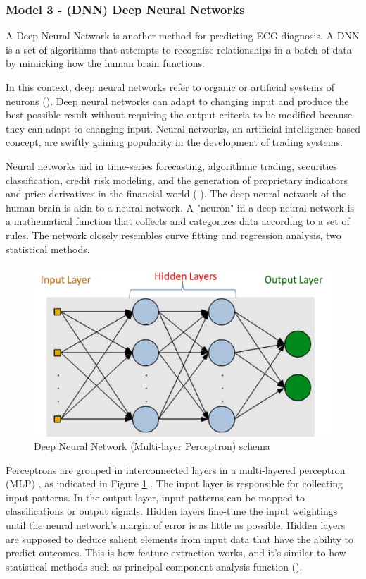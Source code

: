\subsubsection{Model 3 - (DNN) Deep Neural Networks} \label{3model3}

A Deep Neural Network is another method for predicting ECG diagnosis. A DNN is a set of algorithms that attempts to recognize relationships in a batch of data by mimicking how the human brain functions.

In this context, deep neural networks refer to organic or artificial systems of neurons (\cite{ann1}). Deep neural networks can adapt to changing input and produce the best possible result without requiring the output criteria to be modified because they can adapt to changing input. Neural networks, an artificial intelligence-based concept, are swiftly gaining popularity in the development of trading systems.

Neural networks aid in time-series forecasting, algorithmic trading, securities classification, credit risk modeling, and the generation of proprietary indicators and price derivatives in the financial world (\cite{ann2} \cite{ann3}). The deep neural network of the human brain is akin to a neural network. A "neuron" in a deep neural network is a mathematical function that collects and categorizes data according to a set of rules. The network closely resembles curve fitting and regression analysis, two statistical methods.

\begin{figure}[h!]
\centering
\includegraphics[scale=0.6]{img/Multilayer-Perceptron.jpg}
\caption{Deep Neural Network (Multi-layer Perceptron) schema}
\label{fig:mlp}
\end{figure}

Perceptrons are grouped in interconnected layers in a multi-layered perceptron (MLP) \cite{ann3}, as indicated in Figure \ref{fig:mlp} . The input layer is responsible for collecting input patterns. In the output layer, input patterns can be mapped to classifications or output signals. Hidden layers fine-tune the input weightings until the neural network's margin of error is as little as possible. Hidden layers are supposed to deduce salient elements from input data that have the ability to predict outcomes. This is how feature extraction works, and it's similar to how statistical methods such as principal component analysis function (\cite{ann3}).

